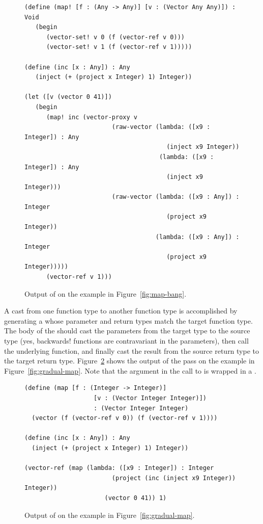 \documentclass[7x10]{TimesAPriori_MIT}%
\begin{document}
\begin{figure}[tbp]
\begin{lstlisting}
(define (map! [f : (Any -> Any)] [v : (Vector Any Any)]) : Void
   (begin 
      (vector-set! v 0 (f (vector-ref v 0)))
      (vector-set! v 1 (f (vector-ref v 1)))))
  
(define (inc [x : Any]) : Any
   (inject (+ (project x Integer) 1) Integer))

(let ([v (vector 0 41)])
   (begin 
      (map! inc (vector-proxy v
                        (raw-vector (lambda: ([x9 : Integer]) : Any
                                       (inject x9 Integer))
                                     (lambda: ([x9 : Integer]) : Any
                                       (inject x9 Integer)))
                        (raw-vector (lambda: ([x9 : Any]) : Integer
                                       (project x9 Integer))
                                    (lambda: ([x9 : Any]) : Integer
                                       (project x9 Integer)))))
      (vector-ref v 1)))
\end{lstlisting}
\caption{Output of  on the example in
  Figure~\ref{fig:map-bang}.}
\label{fig:map-bang-lower-cast}
\end{figure}

A cast from one function type to another function type is accomplished
by generating a  whose parameter and return types match
the target function type. The body of the  should cast
the parameters from the target type to the source type (yes,
backwards! functions are contravariant in the
parameters), then call the underlying function, and finally cast the
result from the source return type to the target return type.
Figure~\ref{fig:map-lower-cast} shows the output of the
 pass on the  example in
Figure~\ref{fig:gradual-map}. Note that the  argument
in the call to  is wrapped in a .

\begin{figure}[tbp]
\begin{lstlisting}
(define (map [f : (Integer -> Integer)]
                   [v : (Vector Integer Integer)])
                   : (Vector Integer Integer)
  (vector (f (vector-ref v 0)) (f (vector-ref v 1))))

(define (inc [x : Any]) : Any
  (inject (+ (project x Integer) 1) Integer))

(vector-ref (map (lambda: ([x9 : Integer]) : Integer
                        (project (inc (inject x9 Integer)) Integer))
                      (vector 0 41)) 1)
\end{lstlisting}
\caption{Output of  on the example in
  Figure~\ref{fig:gradual-map}.}
\label{fig:map-lower-cast}
\end{figure}
\end{document}
